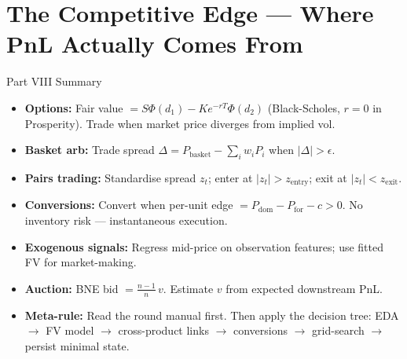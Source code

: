 \documentclass[12pt,a4paper,openany]{report}
\theoremstyle{definition}
\begin{document}
\section{The Competitive Edge — Where PnL Actually Comes From}

\begin{center}
\end{center}

\begin{takeawaybox}{Part VIII Summary}
\begin{itemize}
  \item \textbf{Options:} Fair value $= S\Phi(d_1) - Ke^{-rT}\Phi(d_2)$ (Black-Scholes, $r=0$ in Prosperity). Trade when market price diverges from implied vol.
  \item \textbf{Basket arb:} Trade spread $\Delta = P_{\text{basket}} - \sum_i w_i P_i$ when $|\Delta| > \epsilon$.
  \item \textbf{Pairs trading:} Standardise spread $z_t$; enter at $|z_t| > z_{\text{entry}}$; exit at $|z_t| < z_{\text{exit}}$.
  \item \textbf{Conversions:} Convert when per-unit edge $= P_{\text{dom}} - P_{\text{for}} - c > 0$. No inventory risk — instantaneous execution.
  \item \textbf{Exogenous signals:} Regress mid-price on observation features; use fitted FV for market-making.
  \item \textbf{Auction:} BNE bid $= \frac{n-1}{n}\,v$. Estimate $v$ from expected downstream PnL.
  \item \textbf{Meta-rule:} Read the round manual first. Then apply the decision tree: EDA $\to$ FV model $\to$ cross-product links $\to$ conversions $\to$ grid-search $\to$ persist minimal state.
\end{itemize}
\end{takeawaybox}
\end{document}
